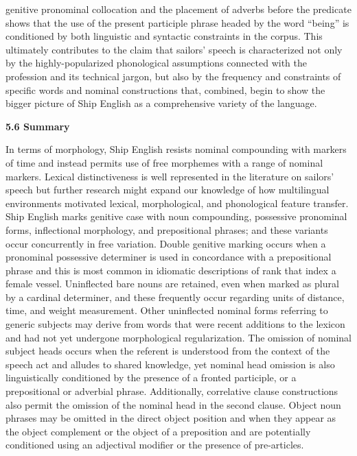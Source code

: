 \begin{styleStandard}
genitive pronominal collocation and the placement of adverbs before the predicate shows that the use of the present participle phrase headed by the word “being” is conditioned by both linguistic and syntactic constraints in the corpus. This ultimately contributes to the claim that sailors’ speech is characterized not only by the highly-popularized phonological assumptions connected with the profession and its technical jargon, but also by the frequency and constraints of specific words and nominal constructions that, combined, begin to show the bigger picture of Ship English as a comprehensive variety of the language. \ 
\end{styleStandard}

\begin{styleStandard}
\textbf{5.6 Summary }
\end{styleStandard}

\begin{styleStandard}
In terms of morphology, Ship English resists nominal compounding with markers of time and instead permits use of free morphemes with a range of nominal markers. Lexical distinctiveness is well represented in the literature on sailors’ speech but further research might expand our knowledge of how multilingual environments motivated lexical, morphological, and phonological feature transfer. Ship English marks genitive case with noun compounding, possessive pronominal forms, inflectional morphology, and prepositional phrases; and these variants occur concurrently in free variation. Double genitive marking occurs when a pronominal possessive determiner is used in concordance with a prepositional phrase and this is most common in idiomatic descriptions of rank that index a female vessel. Uninflected bare nouns are retained, even when marked as plural by a cardinal determiner, and these frequently occur regarding units of distance, time, and weight measurement. Other uninflected nominal forms referring to generic subjects may derive from words that were recent additions to the lexicon and had not yet undergone morphological regularization. The omission of nominal subject heads occurs when the referent is understood from the context of the speech act and alludes to shared knowledge, yet nominal head omission is also linguistically conditioned by the presence of a fronted participle, or a prepositional or adverbial phrase. Additionally, correlative clause constructions also permit the omission of the nominal head in the second clause. Object noun phrases may be omitted in the direct object position and when they appear as the object complement or the object of a preposition and are potentially conditioned using an adjectival modifier or the presence of pre-articles.
\end{styleStandard}

